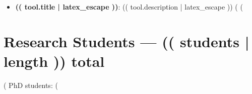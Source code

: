 \documentclass[10pt]{article}
\begin{document}
\begin{itemize}
(%
  \item \textbf{(( tool.title | latex_escape ))}: (( tool.description | latex_escape ))
  (%
(%
\end{itemize}

\section{Research Students --- (( students | length )) total}

(%
PhD students: (%
\end{document}
